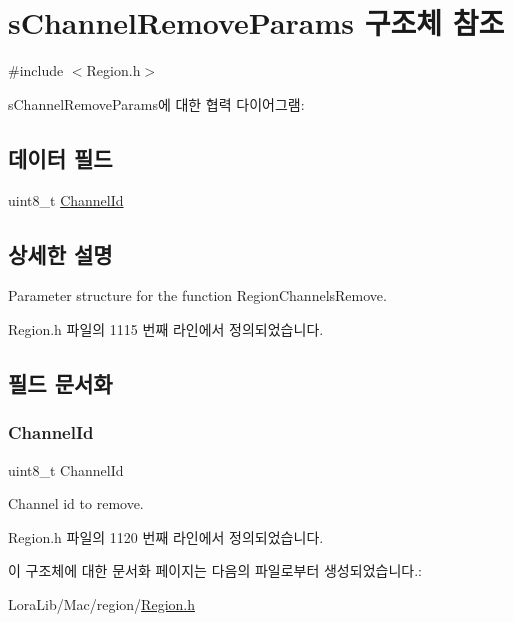 \hypertarget{structs_channel_remove_params}{}\section{s\+Channel\+Remove\+Params 구조체 참조}
\label{structs_channel_remove_params}


{\ttfamily \#include $<$Region.\+h$>$}



s\+Channel\+Remove\+Params에 대한 협력 다이어그램\+:
\subsection*{데이터 필드}
\begin{DoxyCompactItemize}
\item 
uint8\+\_\+t \mbox{\hyperlink{structs_channel_remove_params_ae23f953dc29c360e56a3c856404a3276}{Channel\+Id}}
\end{DoxyCompactItemize}


\subsection{상세한 설명}
Parameter structure for the function Region\+Channels\+Remove. 

Region.\+h 파일의 1115 번째 라인에서 정의되었습니다.



\subsection{필드 문서화}
\mbox{\label{structs_channel_remove_params_ae23f953dc29c360e56a3c856404a3276}} 
\subsubsection{\texorpdfstring{Channel\+Id}{ChannelId}}
{\footnotesize\ttfamily uint8\+\_\+t Channel\+Id}

Channel id to remove. 

Region.\+h 파일의 1120 번째 라인에서 정의되었습니다.



이 구조체에 대한 문서화 페이지는 다음의 파일로부터 생성되었습니다.\+:\begin{DoxyCompactItemize}
\item 
Lora\+Lib/\+Mac/region/\mbox{\hyperlink{_region_8h}{Region.\+h}}\end{DoxyCompactItemize}
